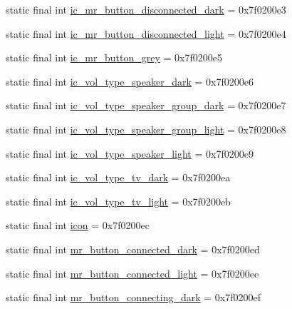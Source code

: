 \begin{CompactItemize}
\item 
static final int \hyperlink{classandroid_1_1support_1_1v4_1_1_r_1_1drawable_e3bcae7a0776dcf2569ae5c490835be1}{ic\_\-mr\_\-button\_\-disconnected\_\-dark} = 0x7f0200e3
\item 
static final int \hyperlink{classandroid_1_1support_1_1v4_1_1_r_1_1drawable_6d6eb2414a1c133d6725adb0988fc9cf}{ic\_\-mr\_\-button\_\-disconnected\_\-light} = 0x7f0200e4
\item 
static final int \hyperlink{classandroid_1_1support_1_1v4_1_1_r_1_1drawable_7883e34364f18a68555fc69a5a7eef55}{ic\_\-mr\_\-button\_\-grey} = 0x7f0200e5
\item 
static final int \hyperlink{classandroid_1_1support_1_1v4_1_1_r_1_1drawable_9e9083c2fb596cf2ddbd4666d9ac1f2c}{ic\_\-vol\_\-type\_\-speaker\_\-dark} = 0x7f0200e6
\item 
static final int \hyperlink{classandroid_1_1support_1_1v4_1_1_r_1_1drawable_d79a042d593208d96852a00d656e0df2}{ic\_\-vol\_\-type\_\-speaker\_\-group\_\-dark} = 0x7f0200e7
\item 
static final int \hyperlink{classandroid_1_1support_1_1v4_1_1_r_1_1drawable_23ad6bfecb8902950a0c0bd8833ec94a}{ic\_\-vol\_\-type\_\-speaker\_\-group\_\-light} = 0x7f0200e8
\item 
static final int \hyperlink{classandroid_1_1support_1_1v4_1_1_r_1_1drawable_38453e2bfbfea9e3c60f22896b8fa20f}{ic\_\-vol\_\-type\_\-speaker\_\-light} = 0x7f0200e9
\item 
static final int \hyperlink{classandroid_1_1support_1_1v4_1_1_r_1_1drawable_1bc6f574c7b5be24daf75da937902fd2}{ic\_\-vol\_\-type\_\-tv\_\-dark} = 0x7f0200ea
\item 
static final int \hyperlink{classandroid_1_1support_1_1v4_1_1_r_1_1drawable_43bd16cd1bb60ad47cf5839ae89a53e5}{ic\_\-vol\_\-type\_\-tv\_\-light} = 0x7f0200eb
\item 
static final int \hyperlink{classandroid_1_1support_1_1v4_1_1_r_1_1drawable_c341330967c1c55fbcd3ce6b09cc30be}{icon} = 0x7f0200ec
\item 
static final int \hyperlink{classandroid_1_1support_1_1v4_1_1_r_1_1drawable_be124dbe642c80ec86bb3d9105dc560f}{mr\_\-button\_\-connected\_\-dark} = 0x7f0200ed
\item 
static final int \hyperlink{classandroid_1_1support_1_1v4_1_1_r_1_1drawable_c77dba331e3b34eb64aa8e4f4e2997cb}{mr\_\-button\_\-connected\_\-light} = 0x7f0200ee
\item 
static final int \hyperlink{classandroid_1_1support_1_1v4_1_1_r_1_1drawable_716cbee092db532647c4386d747b7e6e}{mr\_\-button\_\-connecting\_\-dark} = 0x7f0200ef

\end{CompactItemize}
